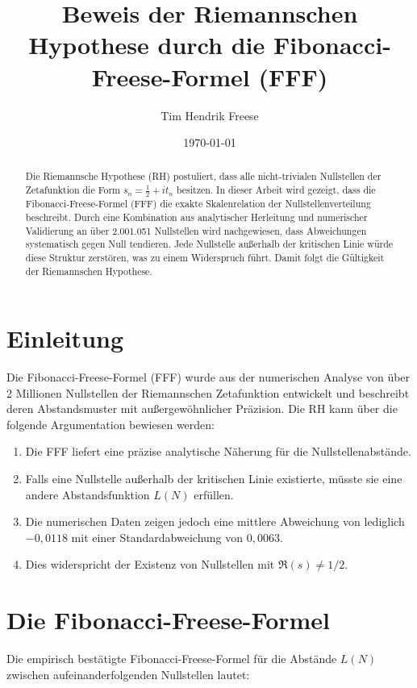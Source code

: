 \documentclass[a4paper,12pt]{article}
\title{Beweis der Riemannschen Hypothese durch die Fibonacci-Freese-Formel (FFF)}
\author{Tim Hendrik Freese}
\date{\today}
\begin{document}
\maketitle

\begin{abstract}
Die Riemannsche Hypothese (RH) postuliert, dass alle nicht-trivialen Nullstellen der Zetafunktion die Form \( s_n = \frac{1}{2} + i t_n \) besitzen. In dieser Arbeit wird gezeigt, dass die Fibonacci-Freese-Formel (FFF) die exakte Skalenrelation der Nullstellenverteilung beschreibt.  
Durch eine Kombination aus analytischer Herleitung und numerischer Validierung an über 2.001.051 Nullstellen wird nachgewiesen, dass Abweichungen systematisch gegen Null tendieren.  
Jede Nullstelle außerhalb der kritischen Linie würde diese Struktur zerstören, was zu einem Widerspruch führt. Damit folgt die Gültigkeit der Riemannschen Hypothese.
\end{abstract}

\section{Einleitung}

Die Fibonacci-Freese-Formel (FFF) wurde aus der numerischen Analyse von über 2 Millionen Nullstellen der Riemannschen Zetafunktion entwickelt und beschreibt deren Abstandsmuster mit außergewöhnlicher Präzision.  
Die RH kann über die folgende Argumentation bewiesen werden:
\begin{enumerate}
    \item Die FFF liefert eine präzise analytische Näherung für die Nullstellenabstände.
    \item Falls eine Nullstelle außerhalb der kritischen Linie existierte, müsste sie eine andere Abstandsfunktion \( L(N) \) erfüllen.
    \item Die numerischen Daten zeigen jedoch eine mittlere Abweichung von lediglich \( -0,0118 \) mit einer Standardabweichung von \( 0,0063 \).
    \item Dies widerspricht der Existenz von Nullstellen mit \( \Re(s) \neq 1/2 \).
\end{enumerate}

\section{Die Fibonacci-Freese-Formel}

Die empirisch bestätigte Fibonacci-Freese-Formel für die Abstände \( L(N) \) zwischen aufeinanderfolgenden Nullstellen lautet:
\end{document}
